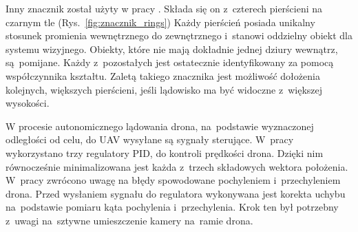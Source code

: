 Inny znacznik został użyty w pracy \cite{Rings}. 
Składa się on z~czterech pierścieni na czarnym tle (Rys.~\ref{fig:znacznik_rings})
Każdy pierścień posiada unikalny stosunek promienia wewnętrznego do zewnętrznego i~stanowi oddzielny obiekt dla systemu wizyjnego. 
Obiekty, które nie mają dokładnie jednej dziury wewnątrz, są~pomijane. 
Każdy z~pozostałych jest ostatecznie identyfikowany za pomocą współczynnika kształtu. 
Zaletą takiego znacznika jest możliwość dołożenia kolejnych, większych pierścieni, jeśli lądowisko ma być widoczne z~większej wysokości.\par %


W procesie autonomicznego lądowania drona, na~podstawie wyznaczonej odległości od celu, do UAV wysyłane są sygnały sterujące. 
W~pracy \cite{Sudevan} wykorzystano trzy regulatory PID, do kontroli prędkości drona. %
Dzięki nim równocześnie minimalizowana jest każda z~trzech składowych wektora położenia. 
W~pracy \cite{Rings} zwrócono uwagę na błędy spowodowane pochyleniem i~przechyleniem drona. 
Przed wysłaniem sygnału do regulatora wykonywana jest korekta uchybu na~podstawie pomiaru kąta pochylenia i~przechylenia. Krok ten był potrzebny z~uwagi na~sztywne umieszczenie kamery na~ramie drona. \par %

